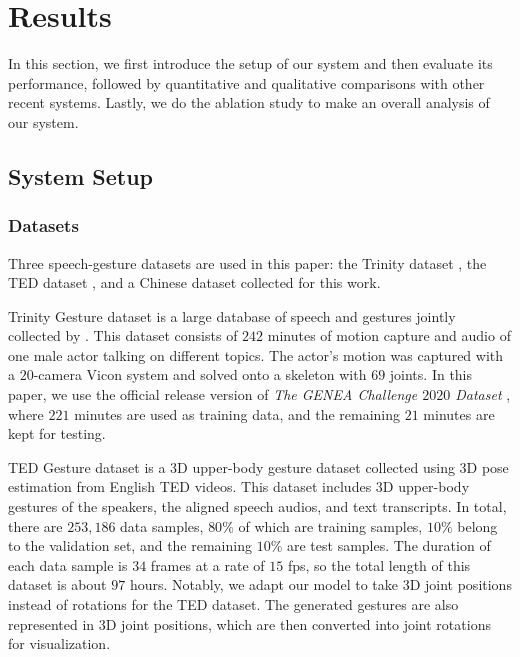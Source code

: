 \documentclass[acmtog,authorversion]{acmart}
\begin{document}
\section{Results}
\label{sec:results}
In this section, we first introduce the setup of our system and then evaluate its performance, followed by quantitative and qualitative comparisons with other recent systems. Lastly, we do the ablation study to make an overall analysis of our system.

\subsection{System Setup}
\label{subsec:system_setup}
\subsubsection{Datasets}
\label{subsubsection:datasets}
Three speech-gesture datasets are used in this paper: the Trinity dataset \cite{ferstl2018investigating}, the TED dataset \cite{yoon2019robots}, and a Chinese dataset collected for this work.

Trinity Gesture dataset is a large database of speech and gestures jointly collected by \citet{ferstl2018investigating}. This dataset consists of $242$ minutes of motion capture and audio of one male actor talking on different topics. The actor’s motion was captured with a $20$-camera Vicon system and solved onto a skeleton with $69$ joints. In this paper, we use the official release version of \emph{The GENEA Challenge $2020$ Dataset} \cite{kucherenko2021large}, where $221$ minutes are used as training data, and the remaining $21$ minutes are kept for testing.

TED Gesture dataset \cite{yoon2019robots} is a 3D upper-body gesture dataset collected using 3D pose estimation from English TED videos. This dataset includes 3D upper-body gestures of the speakers, the aligned speech audios, and text transcripts. In total, there are $253,186$ data samples, $80\%$ of which are training samples, $10\%$ belong to the validation set, and the remaining $10\%$ are test samples. The duration of each data sample is $34$ frames at a rate of $15$ fps, so the total length of this dataset is about $97$ hours. Notably, we adapt our model to take 3D joint positions instead of rotations for the TED dataset. The generated gestures are also represented in 3D joint positions, which are then converted into joint rotations for visualization.
\end{document}
